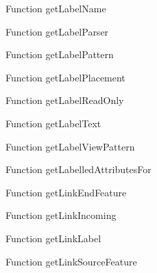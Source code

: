 \begin{minipage}[b]{0.5\textwidth}
\centering
{}
Function getLabelName
\end{minipage}
\begin{minipage}[b]{0.5\textwidth}
\centering
{}
Function getLabelParser
\end{minipage}
\begin{minipage}[b]{0.5\textwidth}
\centering
{}
Function getLabelPattern
\end{minipage}
\begin{minipage}[b]{0.5\textwidth}
\centering
{}
Function getLabelPlacement
\end{minipage}
\begin{minipage}[b]{0.5\textwidth}
\centering
{}
Function getLabelReadOnly
\end{minipage}
\begin{minipage}[b]{0.5\textwidth}
\centering
{}
Function getLabelText
\end{minipage}
\begin{minipage}[b]{0.5\textwidth}
\centering
{}
Function getLabelViewPattern
\end{minipage}
\begin{minipage}[b]{0.5\textwidth}
\centering
{}
Function getLabelledAttributesFor
\end{minipage}
\begin{minipage}[b]{0.5\textwidth}
\centering
{}
Function getLinkEndFeature
\end{minipage}
\begin{minipage}[b]{0.5\textwidth}
\centering
{}
Function getLinkIncoming
\end{minipage}
\begin{minipage}[b]{0.5\textwidth}
\centering
{}
Function getLinkLabel
\end{minipage}
\begin{minipage}[b]{0.5\textwidth}
\centering
{}
Function getLinkSourceFeature
\end{minipage}
